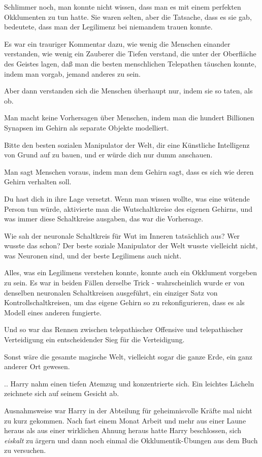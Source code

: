 {Schlimmer noch, man konnte nicht wissen, dass man es mit einem perfekten Okklumenten zu tun hatte. Sie waren selten, aber die Tatsache, dass es sie gab, bedeutete, dass man der Legilimenz bei niemandem trauen konnte.

Es war ein trauriger Kommentar dazu, wie wenig die Menschen einander verstanden, wie wenig ein Zauberer die Tiefen verstand, die unter der Oberfläche des Geistes lagen, daß man die besten menschlichen Telepathen täuschen konnte, indem man vorgab, jemand anderes zu sein.

Aber dann verstanden sich die Menschen überhaupt nur, indem sie so taten, als ob.

Man macht keine Vorhersagen über Menschen, indem man die hundert Billionen Synapsen im Gehirn als separate Objekte modelliert.

Bitte den besten sozialen Manipulator der Welt, dir eine Künstliche Intelligenz von Grund auf zu bauen, und er würde dich nur dumm anschauen.

Man sagt Menschen voraus, indem man dem Gehirn sagt, dass es sich wie deren Gehirn verhalten soll.

Du hast dich in ihre Lage versetzt. Wenn man wissen wollte, was eine wütende Person tun würde, aktivierte man die Wutschaltkreise des eigenen Gehirns, und was immer diese Schaltkreise ausgaben, das war die Vorhersage.

Wie sah der neuronale Schaltkreis für Wut im Inneren tatsächlich aus? Wer wusste das schon? Der beste soziale Manipulator der Welt wusste vielleicht nicht, was Neuronen sind, und der beste Legilimens auch nicht.

Alles, was ein Legilimens verstehen konnte, konnte auch ein Okklument vorgeben zu sein. Es war in beiden Fällen derselbe Trick - wahrscheinlich wurde er von denselben neuronalen Schaltkreisen ausgeführt, ein einziger Satz von Kontrollschaltkreisen, um das eigene Gehirn so zu rekonfigurieren, dass es als Modell eines anderen fungierte.

Und so war das Rennen zwischen telepathischer Offensive und telepathischer Verteidigung ein entscheidender Sieg für die Verteidigung.

Sonst wäre die gesamte magische Welt, vielleicht sogar die ganze Erde, ein ganz anderer Ort gewesen.

.. Harry nahm einen tiefen Atemzug und konzentrierte sich. Ein leichtes Lächeln zeichnete sich auf seinem Gesicht ab.

Ausnahmsweise war Harry in der Abteilung für geheimnisvolle Kräfte mal nicht zu kurz gekommen. Nach fast einem Monat Arbeit und mehr aus einer Laune heraus als aus einer wirklichen Ahnung heraus hatte Harry beschlossen, sich \emph{eiskalt} zu ärgern und dann noch einmal die Okklumentik-Übungen aus dem Buch zu versuchen.

}
